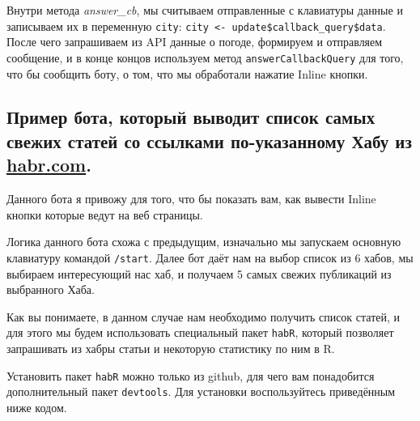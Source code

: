 \documentclass[
]{book}
\begin{document}
Внутри метода \emph{answer\_cb}, мы считываем отправленные с клавиатуры данные и записываем их в переменную \texttt{city}: \texttt{city\ \textless{}-\ update\$callback\_query\$data}. После чего запрашиваем из API данные о погоде, формируем и отправляем сообщение, и в конце концов используем метод \texttt{answerCallbackQuery} для того, что бы сообщить боту, о том, что мы обработали нажатие Inline кнопки.

\hypertarget{ux43fux440ux438ux43cux435ux440-ux431ux43eux442ux430-ux43aux43eux442ux43eux440ux44bux439-ux432ux44bux432ux43eux434ux438ux442-ux441ux43fux438ux441ux43eux43a-ux441ux430ux43cux44bux445-ux441ux432ux435ux436ux438ux445-ux441ux442ux430ux442ux435ux439-ux441ux43e-ux441ux441ux44bux43bux43aux430ux43cux438-ux43fux43e-ux443ux43aux430ux437ux430ux43dux43dux43eux43cux443-ux445ux430ux431ux443-ux438ux437-habr.com.}{%
\subsection{\texorpdfstring{Пример бота, который выводит список самых свежих статей со ссылками по-указанному Хабу из \href{https://habr.com/}{habr.com}.}{Пример бота, который выводит список самых свежих статей со ссылками по-указанному Хабу из habr.com.}}\label{ux43fux440ux438ux43cux435ux440-ux431ux43eux442ux430-ux43aux43eux442ux43eux440ux44bux439-ux432ux44bux432ux43eux434ux438ux442-ux441ux43fux438ux441ux43eux43a-ux441ux430ux43cux44bux445-ux441ux432ux435ux436ux438ux445-ux441ux442ux430ux442ux435ux439-ux441ux43e-ux441ux441ux44bux43bux43aux430ux43cux438-ux43fux43e-ux443ux43aux430ux437ux430ux43dux43dux43eux43cux443-ux445ux430ux431ux443-ux438ux437-habr.com.}}

Данного бота я привожу для того, что бы показать вам, как вывести Inline кнопки которые ведут на веб страницы.

Логика данного бота схожа с предыдущим, изначально мы запускаем основную клавиатуру командой \texttt{/start}. Далее бот даёт нам на выбор список из 6 хабов, мы выбираем интересующий нас хаб, и получаем 5 самых свежих публикаций из выбранного Хаба.

Как вы понимаете, в данном случае нам необходимо получить список статей, и для этого мы будем использовать специальный пакет \texttt{habR}, который позволяет запрашивать из хабры статьи и некоторую статистику по ним в R.

Установить пакет \texttt{habR} можно только из github, для чего вам понадобится дополнительный пакет \texttt{devtools}. Для установки воспользуйтесь приведённым ниже кодом.
\end{document}
